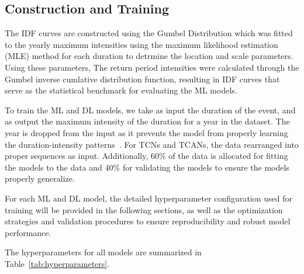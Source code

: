 \subsection{Construction and Training}
The IDF curves are constructed using the Gumbel Distribution which was fitted to the yearly maximum intensities using the maximum likelihood estimation (MLE) method for each duration to detrmine the location and scale parameters.
Using these parameters, The return period intensities were calculated through the Gumbel inverse cumlative distribution function, resulting in IDF curves that serve as the statistical benchmark for evaluating the ML models.

\vspace{1em}

To train the ML and DL models, we take as input the duration of the event, and as output the maximum intensity of the duration for a year in the dataset. The year is dropped from the input as it prevents the model from properly learning the duration-intensity patterns~\cite{14}. For TCNs and TCANs, the data rearranged into proper sequences as input. Additionally, 60\% of the data is allocated for fitting the models to the data and 40\% for validating the models to ensure the models properly generalize. 

\vspace{1em}

For each ML and DL model, the detailed hyperparameter configuration used for training will be provided in the following sections, as well as the optimization strategies and validation procedures to ensure reproducibility and robust model performance.

\vspace{1em}

The hyperparameters for all models are summarized in Table~\ref{tab:hyperparameters}.





